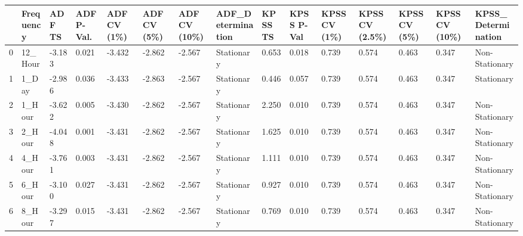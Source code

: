 \begin{tabular}{lllllllllllllll}
\toprule
 & Frequency & ADF TS & ADF P-Val. & ADF CV (1\%) & ADF CV (5\%) & ADF CV (10\%) & ADF_Determination & KPSS TS & KPSS P-Val & KPSS CV (1\%) & KPSS CV (2.5\%) & KPSS CV (5\%) & KPSS CV (10\%) & KPSS_Determination \\
\midrule
0 & 12_Hour & -3.183 & 0.021 & -3.432 & -2.862 & -2.567 & Stationary & 0.653 & 0.018 & 0.739 & 0.574 & 0.463 & 0.347 & Non-Stationary \\
1 & 1_Day & -2.986 & 0.036 & -3.433 & -2.863 & -2.567 & Stationary & 0.446 & 0.057 & 0.739 & 0.574 & 0.463 & 0.347 & Stationary \\
2 & 1_Hour & -3.622 & 0.005 & -3.430 & -2.862 & -2.567 & Stationary & 2.250 & 0.010 & 0.739 & 0.574 & 0.463 & 0.347 & Non-Stationary \\
3 & 2_Hour & -4.048 & 0.001 & -3.431 & -2.862 & -2.567 & Stationary & 1.625 & 0.010 & 0.739 & 0.574 & 0.463 & 0.347 & Non-Stationary \\
4 & 4_Hour & -3.761 & 0.003 & -3.431 & -2.862 & -2.567 & Stationary & 1.111 & 0.010 & 0.739 & 0.574 & 0.463 & 0.347 & Non-Stationary \\
5 & 6_Hour & -3.100 & 0.027 & -3.431 & -2.862 & -2.567 & Stationary & 0.927 & 0.010 & 0.739 & 0.574 & 0.463 & 0.347 & Non-Stationary \\
6 & 8_Hour & -3.297 & 0.015 & -3.431 & -2.862 & -2.567 & Stationary & 0.769 & 0.010 & 0.739 & 0.574 & 0.463 & 0.347 & Non-Stationary \\
\bottomrule
\end{tabular}
